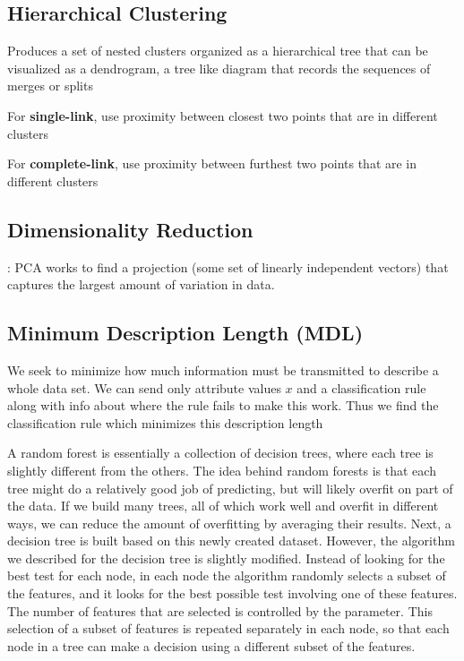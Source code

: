 \documentclass[12pt]{amsart}
\begin{document}
\subsection{Hierarchical Clustering}
Produces a set of nested clusters organized as a
hierarchical tree that can be visualized as a dendrogram, a tree like diagram that records the sequences of
merges or splits

For \textbf{single-link}, use proximity between closest two points that are in different clusters

For \textbf{complete-link}, use proximity between furthest two points that are in different clusters






\subsection{Dimensionality Reduction}: 
PCA works to find a projection (some set of linearly independent vectors) that captures the largest amount of variation in data.

\subsection{Minimum Description Length (MDL)}
We seek to minimize how much information must be transmitted to describe a whole data set. We can send only attribute values $x$ and a classification rule along with info about where the rule fails to make this work. Thus we find the classification rule which minimizes this description length

A random forest is essentially a collection of decision trees, where each tree is slightly different from the others. The idea behind random forests is that each tree might do a relatively good job of predicting, but will likely overfit on part of the data. If we build many trees, all of which work well and overfit in different ways, we can reduce the amount of overfitting by averaging their results. 
Next, a decision tree is built based on this newly created dataset. However, the algorithm we described for the decision tree is slightly modified. Instead of looking for the best test for each node, in each node the algorithm randomly selects a subset of the features, and it looks for the best possible test involving one of these features. The number of features that are selected is controlled by the parameter. This selection of a subset of features is repeated separately in each node, so that each node in a tree can make a decision using a different subset of the features.
\end{document}
